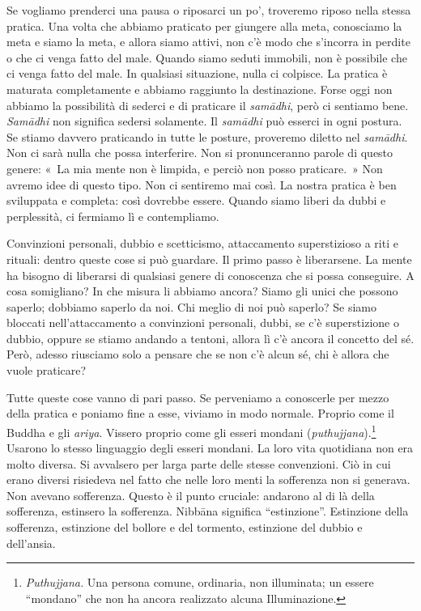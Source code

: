 Se vogliamo prenderci una pausa o riposarci un po', troveremo riposo
nella stessa pratica. Una volta che abbiamo praticato per giungere alla
meta, conosciamo la meta e siamo la meta, e allora siamo attivi, non c'è
modo che s'incorra in perdite o che ci venga fatto del male. Quando
siamo seduti immobili, non è possibile che ci venga fatto del male. In
qualsiasi situazione, nulla ci colpisce. La pratica è maturata
completamente e abbiamo raggiunto la destinazione. Forse oggi non
abbiamo la possibilità di sederci e di praticare il \emph{samādhi}, però
ci sentiamo bene. \emph{Samādhi} non significa sedersi solamente. Il
\emph{samādhi} può esserci in ogni postura. Se stiamo davvero praticando
in tutte le posture, proveremo diletto nel \emph{samādhi}. Non ci sarà
nulla che possa interferire. Non si pronunceranno parole di questo
genere: «~La mia mente non è limpida, e perciò non posso praticare.~»
Non avremo idee di questo tipo. Non ci sentiremo mai così. La nostra
pratica è ben sviluppata e completa: così dovrebbe essere. Quando siamo
liberi da dubbi e perplessità, ci fermiamo lì e contempliamo.

Convinzioni personali, dubbio e scetticismo, attaccamento superstizioso
a riti e rituali: dentro queste cose si può guardare. Il primo passo è
liberarsene. La mente ha bisogno di liberarsi di qualsiasi genere di
conoscenza che si possa conseguire. A cosa somigliano? In che misura li
abbiamo ancora? Siamo gli unici che possono saperlo; dobbiamo saperlo da
noi. Chi meglio di noi può saperlo? Se siamo bloccati nell'attaccamento
a convinzioni personali, dubbi, se c'è superstizione o dubbio, oppure se
stiamo andando a tentoni, allora lì c'è ancora il concetto del sé. Però,
adesso riusciamo solo a pensare che se non c'è alcun sé, chi è allora
che vuole praticare?

Tutte queste cose vanno di pari passo. Se perveniamo a conoscerle per
mezzo della pratica e poniamo fine a esse, viviamo in modo normale.
Proprio come il Buddha e gli \emph{ariya}. Vissero proprio come gli
esseri mondani (\emph{puthujjana}).\footnote{\emph{Puthujjana.} Una
  persona comune, ordinaria, non illuminata; un essere ``mondano'' che
  non ha ancora realizzato alcuna Illuminazione.} Usarono lo stesso
linguaggio degli esseri mondani. La loro vita quotidiana non era molto
diversa. Si avvalsero per larga parte delle stesse convenzioni. Ciò in
cui erano diversi risiedeva nel fatto che nelle loro menti la sofferenza
non si generava. Non avevano sofferenza. Questo è il punto cruciale:
andarono al di là della sofferenza, estinsero la sofferenza.
Nibbāna significa ``estinzione''. Estinzione della sofferenza,
estinzione del bollore e del tormento, estinzione del dubbio e
dell'ansia.

